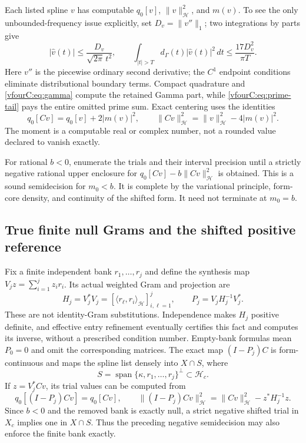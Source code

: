 \documentclass[11pt,a4paper]{article}
\numberwithin{equation}{section}
\theoremstyle{definition}\newtheorem{definition}[theorem]{Definition}
\theoremstyle{remark}\newtheorem{remark}[theorem]{Remark}
\newcommand{\Hh}{\mathcal H}\newcommand{\Hw}{\mathcal H}
\newcommand{\ip}[2]{\langle#1,#2\rangle}\newcommand{\norm}[1]{\lVert#1\rVert}\newcommand{\abs}[1]{\lvert#1\rvert}
\begin{document}
Each listed spline $v$ has computable $q_0[v]$, $\norm v_{\Hh}^2$, and $m(v)$.
To see the only unbounded-frequency issue explicitly, set $D_v=\norm{v''}_1$;
two integrations by parts give
\[
 |\widehat v(t)|\le\frac{D_v}{\sqrt{2\pi}\,t^2},\qquad
 \int_{|t|>T}d_\Gamma(t)|\widehat v(t)|^2\,dt
       \le\frac{17D_v^2}{\pi T}.
\]
Here $v''$ is the piecewise ordinary second derivative; the $C^1$ endpoint
conditions eliminate distributional boundary terms.  Compact quadrature and
\eqref{vfourC:eq:gamma} compute the retained Gamma part, while
\eqref{vfourC:eq:prime-tail} pays the entire omitted prime sum.  Exact centering
uses the identities
\begin{equation}\label{vfourC:eq:centering}
 q_0[Cv]=q_0[v]+2|m(v)|^2,\qquad
 \norm{Cv}_{\Hh}^2=\norm v_{\Hh}^2-4|m(v)|^2.
\end{equation}
The moment is a computable real or complex number, not a rounded value declared
to vanish exactly.

For rational $b<0$, enumerate the trials and their interval precision until a
strictly negative rational upper enclosure for
$q_0[Cv]-b\norm{Cv}_{\Hh}^2$ is obtained.  This is a sound semidecision for
$m_0<b$.  It is complete by the variational principle, form-core density, and
continuity of the shifted form.  It need not terminate at $m_0=b$.

\subsection{True finite null Grams and the shifted positive reference}
\label{vfourC:subsec:reference}

Fix a finite independent bank $r_1,\ldots,r_j$ and define the synthesis map
$V_jz=\sum_{i=1}^jz_i r_i$.  Its actual weighted Gram and projection are
\begin{equation}\label{vfourC:eq:null-gram}
 H_j=V_j^*V_j
       =[\ip{r_\ell}{r_i}_{\Hh}]_{i,\ell=1}^j,
 \qquad P_j=V_jH_j^{-1}V_j^*.
\end{equation}
These are not identity-Gram substitutions.  Independence makes $H_j$ positive
definite, and effective entry refinement eventually certifies this fact and
computes its inverse, without a prescribed condition number.  Empty-bank
formulas mean $P_0=0$ and omit the corresponding matrices.  The exact map
$(I-P_j)C$ is form-continuous and maps the spline list densely into
$X\cap S$, where
\[
 S=\operatorname{span}\{\kappa,r_1,\ldots,r_j\}^{\perp}\subset\Hh_c.
\]
If $z=V_j^*Cv$, its trial values can be computed from
\[
 q_0[(I-P_j)Cv]=q_0[Cv],\qquad
 \norm{(I-P_j)Cv}_{\Hh}^2=\norm{Cv}_{\Hh}^2-z^*H_j^{-1}z.
\]
Since $b<0$ and the removed bank is exactly null, a strict negative shifted
trial in $X_c$ implies one in $X\cap S$.  Thus the preceding negative
semidecision may also enforce the finite bank exactly.
\end{document}
